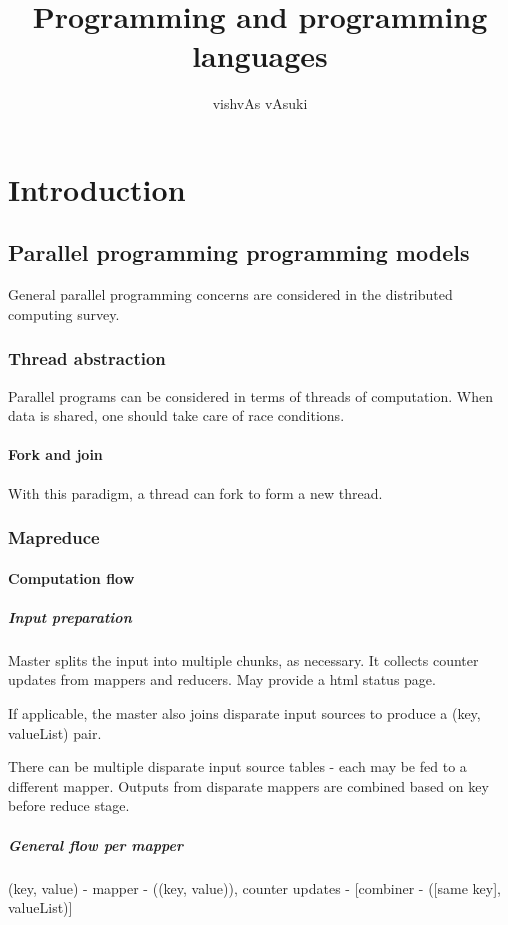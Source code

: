 \documentclass[oneside, article]{memoir}
\title{Programming and programming languages}
\author{vishvAs vAsuki}
\begin{document}
\maketitle
\tableofcontents

\part{Introduction}
\chapter{Parallel programming programming models}
General parallel programming concerns are considered in the distributed computing survey.

\section{Thread abstraction}
Parallel programs can be considered in terms of threads of computation. When data is shared, one should take care of race conditions.

\subsection{Fork and join}
With this paradigm, a thread can fork to form a new thread. \tbc

\section{Mapreduce}
\subsection{Computation flow}
\subsubsection{Input preparation}
Master splits the input into multiple chunks, as necessary. It collects counter updates from mappers and reducers. May provide a html status page.

If applicable, the master also joins disparate input sources to produce a (key, valueList) pair.

There can be multiple disparate input source tables - each may be fed to a different mapper. Outputs from disparate mappers are combined based on key before reduce stage.

\subsubsection{General flow per mapper}
(key, value) - mapper - ((key, value)), counter updates - [combiner - ([same key], valueList)]
\end{document}
